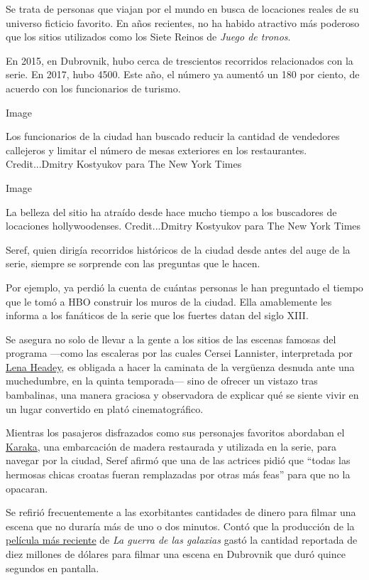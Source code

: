 Se trata de personas que viajan por el mundo en busca de locaciones
reales de su universo ficticio favorito. En años recientes, no ha habido
atractivo más poderoso que los sitios utilizados como los Siete Reinos
de \emph{Juego de tronos}.

En 2015, en Dubrovnik, hubo cerca de trescientos recorridos relacionados
con la serie. En 2017, hubo 4500. Este año, el número ya aumentó un 180
por ciento, de acuerdo con los funcionarios de turismo.

Image

Los funcionarios de la ciudad han buscado reducir la cantidad de
vendedores callejeros y limitar el número de mesas exteriores en los
restaurantes. Credit...Dmitry Kostyukov para The New York Times

Image

La belleza del sitio ha atraído desde hace mucho tiempo a los buscadores
de locaciones hollywoodenses. Credit...Dmitry Kostyukov para The New
York Times

Seref, quien dirigía recorridos históricos de la ciudad desde antes del
auge de la serie, siempre se sorprende con las preguntas que le hacen.

Por ejemplo, ya perdió la cuenta de cuántas personas le han preguntado
el tiempo que le tomó a HBO construir los muros de la ciudad. Ella
amablemente les informa a los fanáticos de la serie que los fuertes
datan del siglo XIII.

Se asegura no solo de llevar a la gente a los sitios de las escenas
famosas del programa ---como las escaleras por las cuales Cersei
Lannister, interpretada por
\href{https://www.nytimes3xbfgragh.onion/es/2017/07/07/lena-headey-cersei-en-game-of-thrones-tiene-sus-propios-poderes/}{Lena
Headey}, es obligada a hacer la caminata de la vergüenza desnuda ante
una muchedumbre, en la quinta temporada--- sino de ofrecer un vistazo
tras bambalinas, una manera graciosa y observadora de explicar qué se
siente vivir en un lugar convertido en plató cinematográfico.

Mientras los pasajeros disfrazados como sus personajes favoritos
abordaban el
\href{http://karaka.info/excursions-dubrovnik/game-of-thrones/}{Karaka},
una embarcación de madera restaurada y utilizada en la serie, para
navegar por la ciudad, Seref afirmó que una de las actrices pidió que
``todas las hermosas chicas croatas fueran remplazadas por otras más
feas'' para que no la opacaran.

Se refirió frecuentemente a las exorbitantes cantidades de dinero para
filmar una escena que no duraría más de uno o dos minutos. Contó que la
producción de la
\href{https://www.nytimes3xbfgragh.onion/es/2017/12/12/resena-star-wars-galaxias-ultimos-jedi/}{película
más reciente} de \emph{La guerra de las galaxias} gastó la cantidad
reportada de diez millones de dólares para filmar una escena en
Dubrovnik que duró quince segundos en pantalla.

